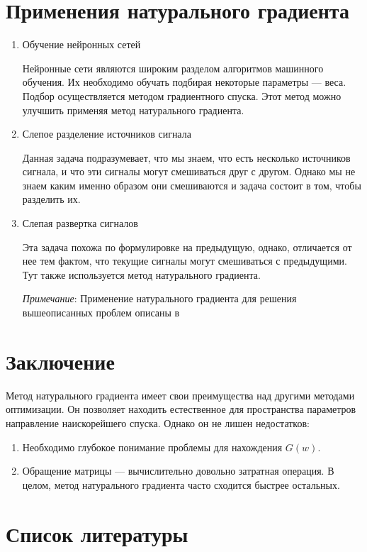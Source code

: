\documentclass[a4paper,12pt]{article}
\begin{document}
\newpage

\section{Применения натурального градиента}
\begin{enumerate}
    \item Обучение нейронных сетей

        Нейронные сети являются широким разделом алгоритмов машинного обучения.
        Их необходимо обучать подбирая некоторые параметры --- веса. Подбор осуществляется методом градиентного спуска.
        Этот метод можно улучшить применяя метод натурального градиента.

    \item Слепое разделение источников сигнала

        Данная задача подразумевает, что мы знаем, что есть несколько источников сигнала, и что эти сигналы могут смешиваться
        друг с другом. Однако мы не знаем каким именно образом они смешиваются и задача состоит в том, чтобы разделить их.

    \item Слепая развертка сигналов

        Эта задача похожа по формулировке на предыдущую, однако, отличается от нее тем фактом, что текущие сигналы могут смешиваться
        с предыдущими. Тут также используется метод натурального градиента.

    \emph{Примечание}:
        Применение натурального градиента для решения вышеописанных проблем описаны в \cite{AmariWorks}
\end{enumerate}
\newpage
 
\section{Заключение}
Метод натурального градиента имеет свои преимущества над другими методами оптимизации. Он позволяет находить естественное для пространства параметров направление наискорейшего спуска. Однако он не лишен недостатков: 
\begin{enumerate}
    \item Необходимо глубокое понимание проблемы для нахождения $G(w)$. 
    \item Обращение матрицы --- вычислительно довольно затратная операция. В целом, метод натурального градиента часто сходится быстрее остальных.
\end{enumerate}
\newpage 

\section{Список литературы}
\nocite{*}
\printbibliography[heading=none]
\end{document}
